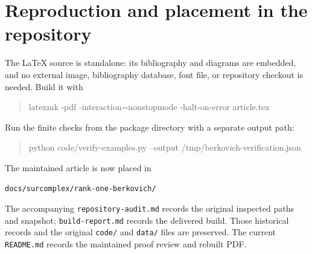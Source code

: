 \documentclass[11pt,a4paper]{article}
\numberwithin{equation}{section}
\theoremstyle{definition}
\theoremstyle{remark}
\begin{document}
\section{Reproduction and placement in the repository}
The LaTeX source is standalone: its bibliography and diagrams are embedded, and
no external image, bibliography database, font file, or repository checkout is
needed. Build it with
\begin{quote}\ttfamily\small
latexmk -pdf -interaction=nonstopmode -halt-on-error article.tex
\end{quote}
\begin{samepage}
Run the finite checks from the package directory with a separate output path:
\begin{quote}\ttfamily\small
python code/verify-examples.py --output /tmp/berkovich-verification.json
\end{quote}
\end{samepage}
The maintained article is now placed in
\begin{center}\small\texttt{docs/surcomplex/rank-one-berkovich/}\end{center}
The accompanying \texttt{repository-audit.md} records the original inspected
paths and snapshot; \texttt{build-report.md} records the delivered build.
Those historical records and the original \texttt{code/} and \texttt{data/}
files are preserved. The current \texttt{README.md} records the maintained
proof review and rebuilt PDF.
\end{document}
